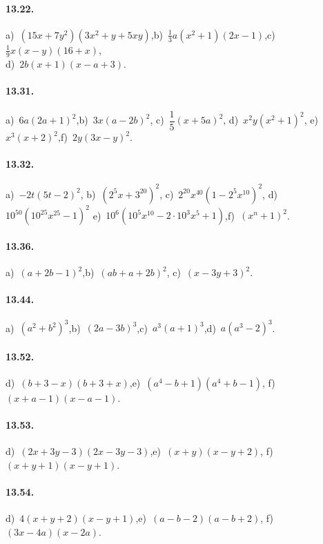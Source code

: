 \paragraph{13.22.}
a)~$\left(15x+7y^{2}\right)\left(3x^{2}+y+5xy\right)$,\quad b)~$\frac{1}{3}a(x^{2}+1)(2x-1)$,\quad c)~$\frac{1}{9}x(x-y)(16+x)$, \protect\\ d)~$2b(x+1)(x-a+3)$.

\paragraph{13.31.}
a)~$6a(2a+1)^{2}$,\quad b)~$3x(a-2b)^{2}$, \quad c)~$\dfrac{1}{5}(x+5a)^{2}$, \quad d)~$x^{2}y\left(x^{2}+1\right)^{2}$, \quad e)~$x^{3}(x+2)^{2}$,\quad f)~$2y(3x-y)^{2}$.

\paragraph{13.32.}
a)~$-2t(5t-2)^{2}$, \quad b)~$\left(2^{5}x+3^{20}\right)^{2}$, \quad c)~$2^{20} x^{40}\left(1-2^{5}x^{10} \right)^2$, \quad d)~$10^{50}\left(10^{25} x^{25}-1 \right)^2$ \quad e)~$10^{6} \left(10^{5} x^{10}-2 \cdot 10^{3}x^{5}+1\right)$,\quad f)~$\left(x^{n}+1\right)^2$.

\paragraph{13.36.}
a)~$(a+2b-1)^{2}$,\quad b)~$(ab+a+2b)^{2}$, \quad c)~$(x-3y+3)^{2}$.

\paragraph{13.44.}
a)~$\left(a^{2}+b^{2}\right)^{3}$,\quad b)~$(2a-3b)^{3}$,\quad c)~$a^{3}(a+1)^{3}$,\quad d)~$a\left(a^3-2\right)^3$.

\paragraph{13.52.}
d)~$(b+3-x)(b+3+x)$,\quad e)~$(a^{4}-b+1)(a^{4}+b-1)$, \quad f)~$(x+a-1)(x-a-1)$.

\paragraph{13.53.}
d)~$(2x+3y-3)(2x-3y-3)$,\quad e)~$(x+y)(x-y+2)$, \quad f)~$(x+y+1)(x-y+1)$.

\paragraph{13.54.}
d)~$4(x+y+2)(x-y+1)$,\quad e)~$(a-b-2)(a-b+2)$, \quad f)~$(3x-4a)(x-2a)$.

